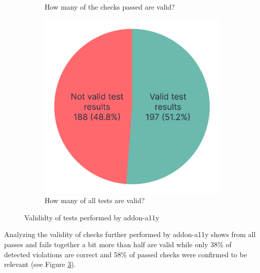 \documentclass{master_thesis}
\begin{document}
\begin{figure}[h]
\begin{subfigure}{0.4\textwidth}
	\caption{How many of the checks passed are valid?}
	\label{fig:checks-validity-passed}
	\end{subfigure}
	\begin{subfigure}{0.4\textwidth}
	\includegraphics[width=\textwidth]{img/all-test-results.png}
	\caption{How many of all tests are valid?}
	\label{fig:checks-validity-all}
	\end{subfigure}
\caption{Valididty of tests performed by addon-a11y}
\label{fig:checks-validity}
\end{figure}

Analyzing the validity of checks further performed by addon-a11y shows from all passes and fails together a bit more than half are valid while only 38\% of detected violations are correct and 58\% of passed checks were confirmed to be relevant (see Figure \ref{fig:checks-validity}).

\end{document}
